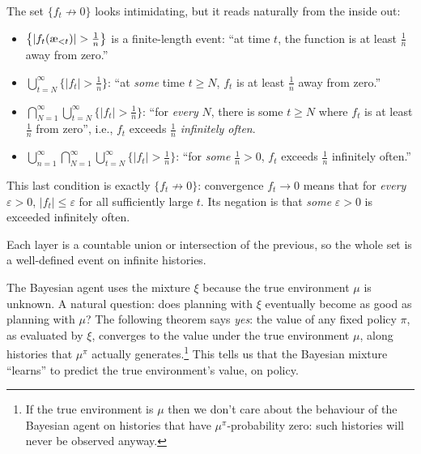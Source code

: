 \documentclass[fontsize=11pt, parskip=half]{scrartcl}
\theoremstyle{definition}
\newcommand{\aes}{\textnormal{\ae}}
\begin{document}
\begin{examplebox}
The set $\{f_t \not\to 0\}$ looks intimidating, but it reads naturally from the inside out:
\begin{itemize}\itemsep=4pt
    \item $\big\{|f_t(\aes_{<t})| > \tfrac{1}{n}\big\}$ is a finite-length event: ``at time $t$, the function is at least $\tfrac{1}{n}$ away from zero.''

    \item $\bigcup_{t=N}^\infty \big\{|f_t| > \tfrac{1}{n}\big\}$: ``at \emph{some} time $t \geq N$, $f_t$ is at least $\tfrac{1}{n}$ away from zero.''

    \item $\bigcap_{N=1}^\infty \bigcup_{t=N}^\infty \big\{|f_t| > \tfrac{1}{n}\big\}$: ``for \emph{every} $N$, there is some $t \geq N$ where $f_t$ is at least $\tfrac{1}{n}$ from zero'', i.e., $f_t$ exceeds $\tfrac{1}{n}$ \emph{infinitely often}.

    \item $\bigcup_{n=1}^\infty \bigcap_{N=1}^\infty \bigcup_{t=N}^\infty \big\{|f_t| > \tfrac{1}{n}\big\}$: ``for \emph{some} $\tfrac{1}{n} > 0$, $f_t$ exceeds $\tfrac{1}{n}$ infinitely often.''
\end{itemize}
This last condition is exactly $\{f_t \not\to 0\}$: convergence $f_t \to 0$ means that for \emph{every} $\varepsilon > 0$, $|f_t| \leq \varepsilon$ for all sufficiently large $t$. Its negation is that \emph{some} $\varepsilon > 0$ is exceeded infinitely often.

Each layer is a countable union or intersection of the previous, so the whole set is a well-defined event on infinite histories.
\end{examplebox}


The Bayesian agent uses the mixture $\xi$ because the true environment $\mu$ is unknown.
A natural question: does planning with $\xi$ eventually become as good as planning with $\mu$?
The following theorem says \emph{yes}: the value of any fixed policy $\pi$, as evaluated by $\xi$, converges to the value under the true environment $\mu$, along histories that $\mu^\pi$ actually generates.\footnote{If the true environment is $\mu$ then we don't care about the behaviour of the Bayesian agent on histories that have $\mu^\pi$-probability zero: such histories will never be observed anyway.}
This tells us that the Bayesian mixture ``learns'' to predict the true environment's value, on policy.
\end{document}
